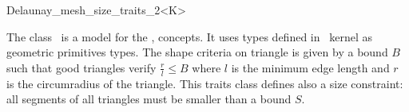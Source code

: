 \begin{ccRefClass}{Delaunay_mesh_size_traits_2<K>}

\ccDefinition
  
The class \ccRefName\ is a model for the ,
concepts. It uses types defined in \cgal\ kernel as geometric
primitives types. The shape criteria on triangle is given by a bound
$B$ such that good triangles verify $\frac{r}{l} \le B$ where $l$ is
the minimum edge length and $r$ is the circumradius of the triangle.
This traits class defines also a size constraint: all segments of all
triangles must be smaller than a bound $S$.


\ccIsModel


\ccCreation
{}

\end{ccRefClass}


